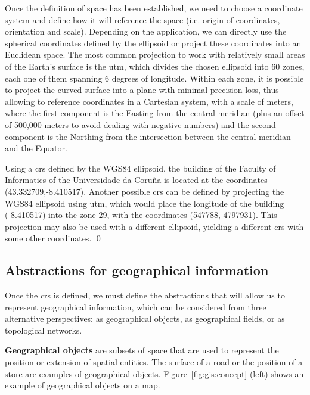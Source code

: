     \medskip
    Once the definition of space has been established, we need to choose a coordinate system and define how it will reference the space (i.e. origin of coordinates, orientation and scale). Depending on the application, we can directly use the spherical coordinates defined by the ellipsoid or project these coordinates into an Euclidean space. The most common projection to work with relatively small areas of the Earth's surface is the \gls{utm}, which divides the chosen ellipsoid into 60 zones, each one of them spanning 6 degrees of longitude. Within each zone, it is possible to project the curved surface into a plane with minimal precision loss,\cite{karney2011transverse} thus allowing to reference coordinates in a Cartesian system, with a scale of meters, where the first component is the Easting from the central meridian (plus an offset of 500,000 meters to avoid dealing with negative numbers) and the second component is the Northing from the intersection between the central meridian and the Equator.
    
    \medskip
    \begin{example}
    Using a \gls{crs} defined by the WGS84 ellipsoid, the building of the Faculty of Informatics of the Universidade da Coru\~na is located at the coordinates (43.332709,-8.410517).
    Another possible \gls{crs} can be defined by projecting the WGS84 ellipsoid using \gls{utm}, which would place the longitude of the building (-8.410517) into the zone 29, with the coordinates (547788, 4797931). This projection may also be used with a different ellipsoid, yielding a different \gls{crs} with some other coordinates.
    \qed
    \end{example}
    
    \subsection{Abstractions for geographical information}
    Once the \gls{crs} is defined, we must define the abstractions that will allow us to represent geographical information, which can be considered from three alternative perspectives: as geographical objects, as geographical fields, or as topological networks.
    
    \textbf{Geographical objects} are subsets of space that are used to represent the position or extension of spatial entities. The surface of a road or the position of a store are examples of geographical objects. Figure~\ref{fig:gis:concept} (left) shows an example of geographical objects on a map.
    
